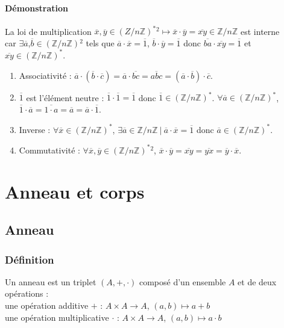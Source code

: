 \documentclass[a4paper,10pt]{book} %
\newcommand{\Z}{\mathbb{Z}}
\newcommand{\tq}{~|~}
\begin{document}
\subsubsection{Démonstration}
La loi de multiplication $\overline{x},\overline{y}\in(Z/n\Z)^*{}^2 \mapsto \overline{x}\cdot \overline{y}=\overline{xy} \in\Z/n\Z$ est interne\\
car $\exists \overline{a}$,$\overline{b}\in(\Z/n\Z){}^2$ tels que $\overline{a}\cdot\overline{x}=\overline{1}$, $\overline{b}\cdot\overline{y}=\overline{1}$ donc $\overline{ba}\cdot\overline{xy}=\overline{1}$ et $\overline{xy}\in (\Z/n\Z)^*$.

\begin{enumerate}
\item Associativité : 
$\overline{a}\cdot (\overline{b}\cdot \overline{c})=\overline{a}\cdot \overline{bc}=\overline{abc}=(\overline{a}\cdot \overline{b})\cdot \overline{c}$.

\item $\overline{1}$ est l'élément neutre :
$\overline{1}\cdot\overline{1}=\overline{1}$ donc $\overline{1}\in(\Z/n\Z)^*$.
$\forall \overline{a}\in(\Z/n\Z)^*$, $\overline{1}\cdot \overline{a}=\overline{1\cdot a}=\overline{a}=\overline{a}\cdot \overline{1}$.

\item Inverse : $\forall \overline{x}\in(\Z/n\Z)^*$, $\exists \overline{a}\in \Z/n\Z \tq \overline{a}\cdot \overline{x}=\overline{1}$ donc $\overline{a}\in(\Z/n\Z)^*$.

\item Commutativité : 
$\forall \overline{x},\overline{y} \in(\Z/n\Z)^*{}^2$, $\overline{x}\cdot \overline{y}=\overline{xy}=\overline{yx}=\overline{y}\cdot \overline{x}$.
\end{enumerate}




\chapter{Anneau et corps}

\section{Anneau}
\subsection{Définition}
Un anneau est un triplet $(A,+,\cdot)$ composé d'un ensemble $A$ et de deux opérations :\\
une opération additive $+$ : $A\times A\rightarrow A$, 
$(a,b)\mapsto a+b$\\
une opération multiplicative $\cdot$ : $A\times A\rightarrow A$,
$(a,b)\mapsto a\cdot b$
\end{document}
